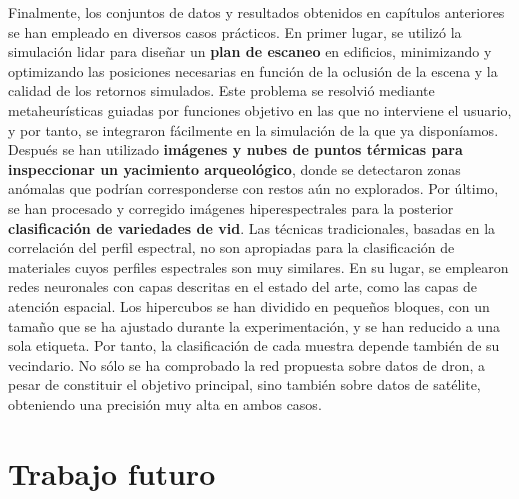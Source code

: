 Finalmente, los conjuntos de datos y resultados obtenidos en capítulos anteriores se han empleado en diversos casos prácticos. En primer lugar, se utilizó la simulación \acrshort{lidar} para diseñar un \textbf{plan de escaneo} en edificios, minimizando y optimizando las posiciones necesarias en función de la oclusión de la escena y la calidad de los retornos simulados. Este problema se resolvió mediante metaheurísticas guiadas por funciones objetivo en las que no interviene el usuario, y por tanto, se integraron fácilmente en la simulación de la que ya disponíamos. Después se han utilizado \textbf{imágenes y nubes de puntos térmicas para inspeccionar un yacimiento arqueológico}, donde se detectaron zonas anómalas que podrían corresponderse con restos aún no explorados. Por último, se han procesado y corregido imágenes hiperespectrales para la posterior \textbf{clasificación de variedades de vid}. Las técnicas tradicionales, basadas en la correlación del perfil espectral, no son apropiadas para la clasificación de materiales cuyos perfiles espectrales son muy similares. En su lugar, se emplearon redes neuronales con capas descritas en el estado del arte, como las capas de atención espacial. Los hipercubos se han dividido en pequeños bloques, con un tamaño que se ha ajustado durante la experimentación, y se han reducido a una sola etiqueta. Por tanto, la clasificación de cada muestra depende también de su vecindario. No sólo se ha comprobado la red propuesta sobre datos de dron, a pesar de constituir el objetivo principal, sino también sobre datos de satélite, obteniendo una precisión muy alta en ambos casos. 

\section{Trabajo futuro}

